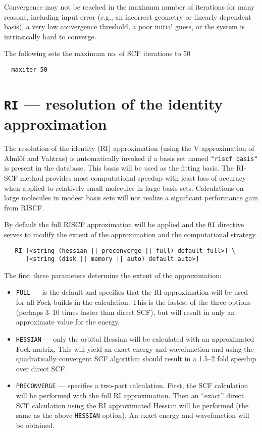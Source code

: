 \fussy

Convergence may not be reached in the maximum number of iterations for
many reasons, including input error (e.g., an incorrect geometry or
linearly dependent basis), a very low convergence threshold, a poor
initial guess, or the system is intrinsically hard to converge. 

The following sets the maximum no. of SCF iterations to 50
\begin{verbatim}
  maxiter 50
\end{verbatim}

\section{{\tt RI} --- resolution of the identity approximation}
\label{sec:riscf}

The resolution of the identity (RI) approximation (using the
V-approximation of Alml\"{o}f and Vahtras) is automatically invoked if
a basis set named \verb+"riscf basis"+ is present in the database.
This basis will be used as the fitting basis.  The RI-SCF method
provides most computational speedup with least loss of accuracy when
applied to relatively small molecules in large basis sets.
Calculations on large molecules in modest basis sets will not realize
a significant performance gain from RISCF.

By default the full RISCF approximation will be applied and the
\verb+RI+ directive serves to modify the extent of the approximation
and the computational strategy.

\begin{verbatim}
   RI [<string (hessian || preconverge || full) default full>] \
      [<string (disk || memory || auto) default auto>]
\end{verbatim}

The first three parameters determine the extent of the approximation:
\begin{itemize} 
\item \verb+FULL+ --- is the default and specifies that the RI
  approximation will be used for all Fock builds in the calculation.
  This is the fastest of the three options (perhaps 3--10 times faster
  than direct SCF), but will result in only an approximate value for
  the energy.

\item \verb+HESSIAN+ --- only the orbital Hessian will be calculated
  with an approximated Fock matrix.  This will yield an exact energy
  and wavefunction and using the quadratically convergent SCF
  algorithm should result in a 1.5--2 fold speedup over direct SCF.

\item \verb+PRECONVERGE+ --- specifies a two-part calculation.  First,
  the SCF calculation will be performed with the full RI
  approximation.  Then an ``exact'' direct SCF calculation using the
  RI approximated Hessian will be performed (the same as the above
  \verb+HESSIAN+ option).  An exact energy and wavefunction will be
  obtained.
\end{itemize}


